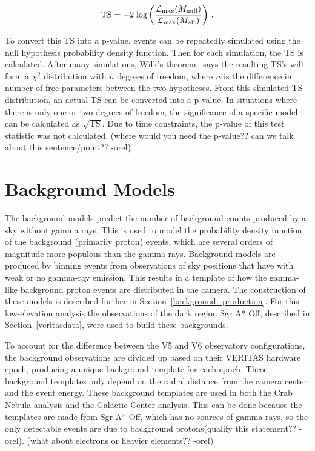   \begin{equation}\label{eqn:tscalc}
    \textrm{TS} = - 2 \; \textrm{log} \left (  \frac{ \mathcal{L}_{\textrm{max}}( M_\textrm{null} ) }{ \mathcal{L}_{\textrm{max}}( M_\textrm{alt} ) } \right ) \,.
  \end{equation}
  
  To convert this TS into a p-value, events can be repeatedly simulated using the null hypothesis probability density function.
  Then for each simulation, the TS is calculated.
  After many simulations, Wilk's theorem~\cite{wilks1938} says the resulting TS's will form a $\chi^2$ distribution with $n$ degrees of freedom, where $n$ is the difference in number of free parameters between the two hypotheses.
  From this simulated TS distribution, an actual TS can be converted into a p-value.
  In situations where there is only one or two degrees of freedom, the significance of a specific model can be calculated as $\sqrt{\textrm{TS}}$.
  Due to time constraints, the p-value of this test statistic was not calculated.
  {\color{red}(where would you need the p-value?? can we talk about this sentence/point?? -orel)}
  

\section{Background Models}\label{sec:bkgmodels}
  The background models predict the number of background counts produced by a sky without gamma rays.
  This is used to model the probability density function of the background (primarily proton) events, which are several orders of magnitude more populous than the gamma rays.
  Background models are produced by binning events from observations of sky positions that have with weak or no gamma-ray emission.
  This results in a template of how the gamma-like background proton events are distributed in the camera.
  The construction of these models is described further in Section~\ref{background_production}.
  For this low-elevation analysis the observations of the dark region Sgr A* Off, described in Section~\ref{veritasdata}, were used to build these backgrounds.
  
  To account for the difference between the V5 and V6 observatory configurations, the background observations are divided up based on their VERITAS hardware epoch, producing a unique background template for each epoch.
  These background templates only depend on the radial distance from the camera center and the event energy.
  These background templates are used in both the Crab Nebula analysis and the Galactic Center analysis.
  This can be done because the templates are made from Sgr A* Off, which has no sources of gamma-rays, so the only detectable events are due to background protons{\color{red}(qualify this statement?? -orel)}.
  {\color{red}(what about electrons or heavier elements?? -orel)}


